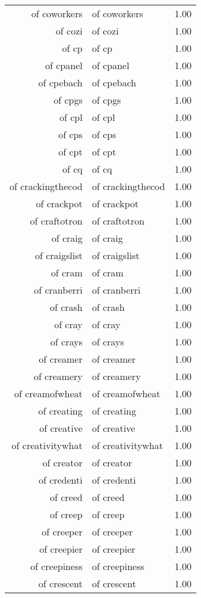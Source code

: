 \begin{table}[ht]
\begin{tabular}{rlr}
  of coworkers & of coworkers & 1.00 \\ 
  of cozi & of cozi & 1.00 \\ 
  of cp & of cp & 1.00 \\ 
  of cpanel & of cpanel & 1.00 \\ 
  of cpebach & of cpebach & 1.00 \\ 
  of cpgs & of cpgs & 1.00 \\ 
  of cpl & of cpl & 1.00 \\ 
  of cps & of cps & 1.00 \\ 
  of cpt & of cpt & 1.00 \\ 
  of cq & of cq & 1.00 \\ 
  of crackingthecod & of crackingthecod & 1.00 \\ 
  of crackpot & of crackpot & 1.00 \\ 
  of craftotron & of craftotron & 1.00 \\ 
  of craig & of craig & 1.00 \\ 
  of craigslist & of craigslist & 1.00 \\ 
  of cram & of cram & 1.00 \\ 
  of cranberri & of cranberri & 1.00 \\ 
  of crash & of crash & 1.00 \\ 
  of cray & of cray & 1.00 \\ 
  of crays & of crays & 1.00 \\ 
  of creamer & of creamer & 1.00 \\ 
  of creamery & of creamery & 1.00 \\ 
  of creamofwheat & of creamofwheat & 1.00 \\ 
  of creating & of creating & 1.00 \\ 
  of creative & of creative & 1.00 \\ 
  of creativitywhat & of creativitywhat & 1.00 \\ 
  of creator & of creator & 1.00 \\ 
  of credenti & of credenti & 1.00 \\ 
  of creed & of creed & 1.00 \\ 
  of creep & of creep & 1.00 \\ 
  of creeper & of creeper & 1.00 \\ 
  of creepier & of creepier & 1.00 \\ 
  of creepiness & of creepiness & 1.00 \\ 
  of crescent & of crescent & 1.00 \\ 

\end{tabular}
\end{table}
